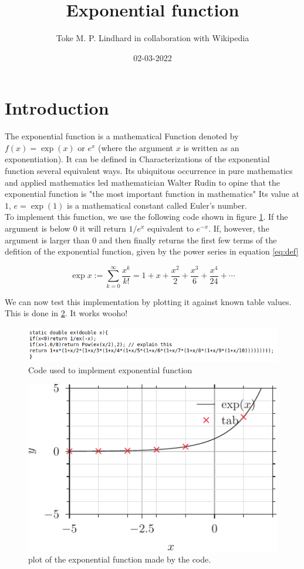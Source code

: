 \documentclass[twocolumn,a4paper,12pt]{article}
\begin{document}
\title{Exponential function}
\author{Toke M. P. Lindhard in collaboration with Wikipedia}
\date{02-03-2022}
\maketitle
\section{Introduction}
The exponential function is a mathematical Function 
denoted by $f(x)=\exp(x)$ or $e^x$ (where the argument $x$ 
is written as an exponentiation). It can be defined in 
Characterizations of the exponential function several equivalent ways. 
Its ubiquitous occurrence in pure mathematics and applied mathematics 
led mathematician Walter Rudin to opine that the exponential function is 
"the most important function in mathematics"
Its value at $1$, $e = \exp(1)$ is a mathematical constant
called Euler's number. \\

To implement this function, we use the following code shown in figure \ref{fig:code}. 
If the argument is below $0$ it will return $1/e^x$ equivalent to $e^{-x}$. If, however, 
the argument is larger than $0$ 
and then finally returns the first few terms of the defition of the exponential function, given by
the power series in equation \ref{eq:def}

\begin{equation}\label{eq:def}
    \exp x := \sum_{k = 0}^{\infty} \frac{x^k}{k!} = 1 + x + \frac{x^2}{2} + \frac{x^3}{6} + \frac{x^4}{24} + \cdots
\end{equation}

We can now test this implementation by plotting it against known table values. This is done in \ref{fig:plot}. 
It works wooho!

\begin{figure}[b]\label{fig:code}
    \includegraphics[width=\linewidth]{codesnippet.png}
    \caption{Code used to implement exponential function}
\end{figure}

\begin{figure}[t]\label{fig:plot}
    \includegraphics{exp.pyx.pdf}
    \caption{plot of the exponential function made by the code.}
\end{figure}
\end{document}
